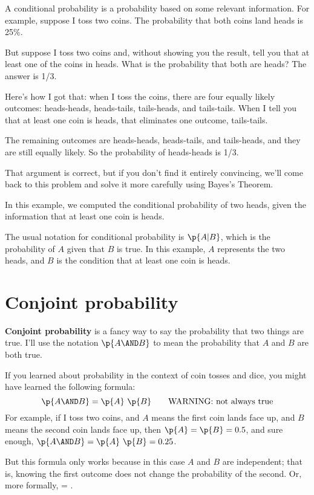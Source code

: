 \documentclass[12pt]{book}
\theoremstyle{exercise}
\begin{document}
A conditional probability is a probability based on some relevant information.  For example, suppose I toss two coins.
The probability that both coins land heads is 25\%.

But suppose I toss two coins and, without showing you the result, tell you that at least one of the coins in heads.
What is the probability that both are heads?
The answer is 1/3.

Here's how I got that: when I toss the coins, there are four equally likely outcomes: heads-heads, heads-tails, tails-heads, and tails-tails.
When I tell you that at least one coin is heads, that eliminates one outcome, tails-tails.

The remaining outcomes are heads-heads, heads-tails, and tails-heads, and they are still equally likely.
So the probability of heads-heads is 1/3.

That argument is correct, but if you don't find it entirely convincing, we'll come back to this problem and solve it more carefully using Bayes's Theorem.

In this example, we computed the conditional probability of two heads, given the information that at least one coin is heads.

The usual notation for conditional probability is $\p{A|B}$, which
is the probability of $A$ given that $B$ is true.  In this
example, $A$ represents the two heads, and $B$ is the condition that at least one coin is heads.


\section{Conjoint probability}

{\bf Conjoint probability} is a fancy way to say the probability that
two things are true.  I'll use the notation $\p{A \AND B}$ to mean the
probability that $A$ and $B$ are both true.


If you learned about probability in the context of coin tosses and
dice, you might have learned the following formula:
%
\[ \p{A \AND B} = \p{A}~\p{B} \quad\quad\mbox{WARNING: not always true}\]
%
For example, if I toss two coins, and $A$ means the first coin lands
face up, and $B$ means the second coin lands face up, then $\p{A} =
\p{B} = 0.5$, and sure enough, $\p{A \AND B} = \p{A}~\p{B} = 0.25$.

But this formula only works because in this case $A$ and $B$ are
independent; that is, knowing the first outcome does
not change the probability of the second.  Or, more formally,
 = .
\end{document}
